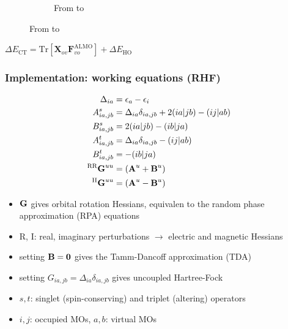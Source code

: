 \documentclass[%
    xcolor=usenames,dvipsnames,svgnames%
]{beamer}
\newenvironment{nscenter}
 {\parskip=0pt\par\nopagebreak\centering}
 {\par\noindent\ignorespacesafterend}
\begin{document}
\begin{frame}
\begin{figure}
\begin{subfigure}[b]{0.50\linewidth}
      \caption*{From  to \ce{[C1C1im]+}}
    \end{subfigure}
  \end{figure}
  \begin{nscenter}
    \(\Delta E_{\text{CT}} = \mathrm{Tr}[\mathbf{X}_{ov}\mathbf{F}_{vo}^{\text{ALMO}}] + \Delta E_{\text{HO}}\)
  \end{nscenter}
\end{frame}

\begin{frame}
  \frametitle{Implementation: working equations (RHF)}
  \begin{align*}
    \Delta_{ia} &= \epsilon_{a} - \epsilon_{i} \\
    A_{ia,jb}^{s} &= \Delta_{ia}\delta_{ia,jb} + 2(ia|jb) - (ij|ab) \\
    B_{ia,jb}^{s} &= 2(ia|jb) - (ib|ja) \\
    A_{ia,jb}^{t} &= \Delta_{ia}\delta_{ia,jb} - (ij|ab) \\
    B_{ia,jb}^{t} &= - (ib|ja) \\
    ^{\text{RR}}\boldsymbol{\mathbf{G}}^{uu} &= (\boldsymbol{\mathbf{A}}^{u} + \boldsymbol{\mathbf{B}}^{u}) \\
    ^{\text{II}}\boldsymbol{\mathbf{G}}^{uu} &= (\boldsymbol{\mathbf{A}}^{u} - \boldsymbol{\mathbf{B}}^{u})
  \end{align*}
  \scriptsize
  \begin{itemize}
  \item \(\boldsymbol{\mathbf{G}}\) gives orbital rotation Hessians, equivalen to the random phase approximation (RPA) equations \\
  \item R, I: real, imaginary perturbations \(\rightarrow\) electric and magnetic Hessians \\
  \item setting \(\boldsymbol{\mathbf{B}} = \boldsymbol{\mathbf{0}}\) gives the Tamm-Dancoff approximation (TDA) \\
  \item setting \( G_{ia,jb} = \Delta_{ia}\delta_{ia,jb} \) gives uncoupled Hartree-Fock \\
  \item \(s,t\): singlet (spin-conserving) and triplet (altering) operators \\
  \item \(i,j\): occupied MOs, \(a,b\): virtual MOs
  \end{itemize}
\end{frame}
\end{document}
